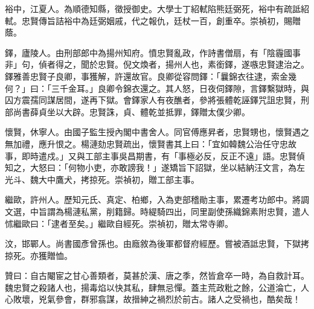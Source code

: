 \begin{pinyinscope}
裕中，江夏人。為順德知縣，徵授御史。大學士丁紹軾陷熊廷弼死，裕中有疏詆紹軾。忠賢傳旨詰裕中為廷弼姻戚，代之報仇，廷杖一百，創重卒。崇禎初，賜贈蔭。

鐸，廬陵人。由刑部郎中為揚州知府。憤忠賢亂政，作詩書僧扇，有「陰霾國事非」句，偵者得之，聞於忠賢。倪文煥者，揚州人也，素銜鐸，遂嗾忠賢逮治之。鐸雅善忠賢子良卿，事獲解，許還故官。良卿從容問鐸：「曩錦衣往逮，索金幾何？」曰：「三千金耳。」良卿令錦衣還之。其人怒，日夜伺鐸隙，言鐸繫獄時，與囚方震孺同謀居間，遂再下獄。會鐸家人有夜醮者，參將張體乾誣鐸咒詛忠賢，刑部尚書薛貞坐以大辟。忠賢誅，貞、體乾並抵罪，鐸贈太僕少卿。

懷賢，休寧人。由國子監生授內閣中書舍人。同官傅應昇者，忠賢甥也，懷賢遇之無加禮，應升恨之。楊漣劾忠賢疏出，懷賢書其上曰：「宜如韓魏公治任守忠故事，即時遣戍。」又與工部主事吳昌期書，有「事極必反，反正不遠」語。忠賢偵知之，大怒曰：「何物小吏，亦敢謗我！」遂矯旨下詔獄，坐以結納汪文言，為左光斗、魏大中鷹犬，拷掠死。崇禎初，贈工部主事。

繼歐，許州人。歷知元氏、真定、柏鄉，入為吏部稽勛主事，累遷考功郎中。將調文選，中旨謂為楊漣私黨，削籍歸。時緹騎四出，同里副使孫織錦素附忠賢，遣人怵繼歐曰：「逮者至矣。」繼歐自經死。崇禎初，贈太常寺卿。

汶，邯鄲人。尚書國彥曾孫也。由廕敘為後軍都督府經歷。嘗被酒詆忠賢，下獄拷掠死。亦獲贈恤。

贊曰：自古閹宦之甘心善類者，莫甚於漢、唐之季，然皆倉卒一時，為自救計耳。魏忠賢之殺諸人也，揚毒焰以快其私，肆無忌憚。蓋主荒政粃之餘，公道淪亡，人心敗壞，兇氣參會，群邪翕謀，故搢紳之禍烈於前古。諸人之受禍也，酷矣哉！


\end{pinyinscope}